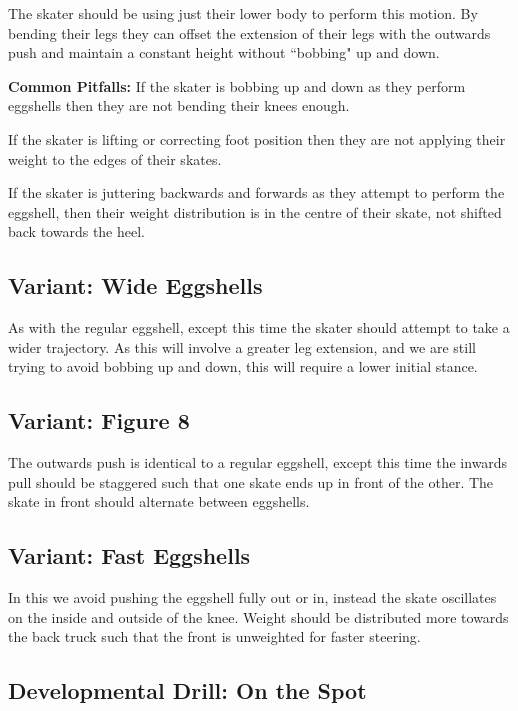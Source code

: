 The skater should be using just their lower body to perform this motion.
By bending their legs they can offset the extension of their legs with the outwards push and maintain a constant height without ``bobbing" up and down. 

{\bf Common Pitfalls: }
If the skater is bobbing up and down as they perform eggshells then they are not bending their knees enough. 

If the skater is lifting or correcting foot position then they are not applying their weight to the edges of their skates.  


If the skater is juttering backwards and forwards as they attempt to perform the eggshell, then their weight distribution is in the centre of their skate, not shifted back towards the heel.   


\subsection*{Variant: Wide Eggshells}
\label{sec:sticky/eggshells/wide}
As with the regular eggshell, except this time the skater should attempt to take a wider trajectory.    
As this will involve a greater leg extension, and we are still trying to avoid bobbing up and down, this will require a lower initial stance.  


\subsection*{Variant: Figure 8}
\label{sec:sticky/eggshells/figure_8}

The outwards push is identical to a regular eggshell, except this time the inwards pull should be staggered such that one skate ends up in front of the other.  
The skate in front should alternate between eggshells. 


\subsection*{Variant: Fast Eggshells}
\label{sec:sticky/eggshells/fast}

In this we avoid pushing the eggshell fully out or in, instead the skate oscillates on the inside and outside of the knee.  
Weight should be distributed more towards the back truck such that the front is unweighted for faster steering.   


\subsection*{Developmental Drill: On the Spot}
\label{drill:sticky/eggshells/spot}


